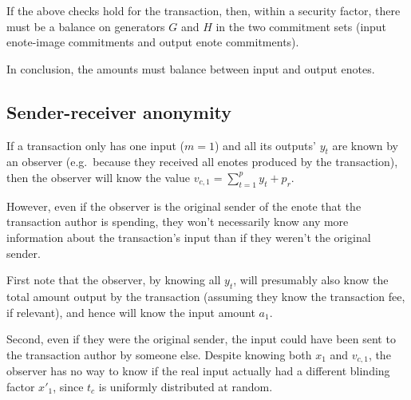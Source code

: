 If the above checks hold for the transaction, then, within a security factor, there must be a balance on generators $G$ and $H$ in the two commitment sets (input enote-image commitments and output enote commitments).

In conclusion, the amounts must balance between input and output enotes.


\subsection{Sender-receiver anonymity}
\label{subsec:confidential-transactions-sender-receiver-anonymity}

If a transaction only has one input ($m = 1$) and all its outputs' $y_t$ are known by an observer (e.g.\ because they received all enotes produced by the transaction), then the observer will know the value $v_{c,1} = \sum^{p}_{t=1} y_t + p_r$.

However, even if the observer is the original sender of the enote that the transaction author is spending, they won't necessarily know any more information about the transaction's input than if they weren't the original sender.

First note that the observer, by knowing all $y_t$, will presumably also know the total amount output by the transaction (assuming they know the transaction fee, if relevant), and hence will know the input amount $a_1$.

Second, even if they were the original sender, the input could have been sent to the transaction author by someone else. Despite knowing both $x_1$ and $v_{c,1}$, the observer has no way to know if the real input actually had a different blinding factor $x'_1$, since $t_c$ is uniformly distributed at random.

